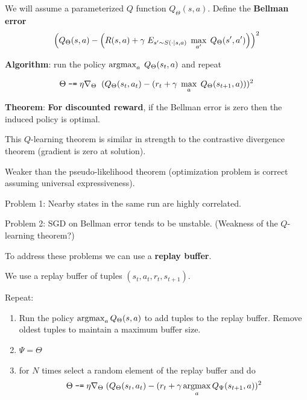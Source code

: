 {

We will assume a parameterized $Q$ function $Q_\Theta(s,a)$.
\vfill
Define the {\bf Bellman error}
$$\left(Q_\Theta(s,a) - \left(R(s,a) + \gamma\;E_{s' \sim S(\cdot|s,a)}\;\max_{a'}\;Q_\Theta(s',a')\right)\right)^2$$

\vfill
{\bf Algorithm}: run the policy $\operatorname*{argmax}_a\;Q_\Theta(s_t,a)$ and repeat

$$\Theta \;\mbox{\tt -=}\; \eta \nabla_\Theta \;\; (Q_\Theta(s_t,a_t) - (r_t + \gamma\;\max_a\;Q_\Theta(s_{t+1},a)))^2$$


\vfill
{\bf Theorem}: {\bf For discounted reward}, if the Bellman error is zero then the induced policy is optimal.

\vfill
This $Q$-learning theorem is similar in strength to the contrastive divergence theorem (gradient is zero at solution).

\vfill
Weaker than the pseudo-likelihood theorem (optimization problem is correct assuming universal expressiveness).


Problem 1: Nearby states in the same run are highly correlated.

\vfill
Problem 2: SGD on Bellman error tends to be unstable. (Weakness of the $Q$-learning theorem?)

\vfill
To address these problems we can use a {\bf replay buffer}.


We use a replay buffer of tuples $(s_t,a_t,r_t,s_{t+1})$.

\vfill
Repeat:

\vfill
\begin{enumerate}

\item Run the policy $\operatorname*{argmax}_a Q_\Theta(s,a)$ to add tuples to the replay buffer.  Remove oldest tuples to maintain a maximum buffer size.

\item $\Psi = \Theta$
  
\item for $N$ times select a random element of the replay buffer and do
$$\Theta \;\mbox{\tt -=} \; \eta \nabla_\Theta\;(Q_\Theta(s_t,a_t) - (r_t + \gamma \operatorname*{argmax}_{a} Q_\Psi(s_{t+1},a))^2$$
\end{enumerate}


}
